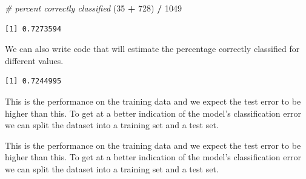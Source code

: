 \documentclass[]{article}
\newenvironment{Shaded}{\begin{snugshade}}{\end{snugshade}}
\newcommand{\CommentTok}[1]{\textcolor[rgb]{0.56,0.35,0.01}{\textit{#1}}}
\newcommand{\DataTypeTok}[1]{\textcolor[rgb]{0.13,0.29,0.53}{#1}}
\newcommand{\DecValTok}[1]{\textcolor[rgb]{0.00,0.00,0.81}{#1}}
\newcommand{\KeywordTok}[1]{\textcolor[rgb]{0.13,0.29,0.53}{\textbf{#1}}}
\newcommand{\NormalTok}[1]{#1}
\newcommand{\OperatorTok}[1]{\textcolor[rgb]{0.81,0.36,0.00}{\textbf{#1}}}
\newcommand{\OtherTok}[1]{\textcolor[rgb]{0.56,0.35,0.01}{#1}}
\newcommand{\StringTok}[1]{\textcolor[rgb]{0.31,0.60,0.02}{#1}}
\begin{document}
\begin{Shaded}
\begin{Highlighting}[]
\CommentTok{# percent correctly classified}
\NormalTok{(}\DecValTok{35} \OperatorTok{+}\StringTok{ }\DecValTok{728}\NormalTok{) }\OperatorTok{/}\StringTok{ }\DecValTok{1049}
\end{Highlighting}
\end{Shaded}

\begin{verbatim}
[1] 0.7273594
\end{verbatim}

We can also write code that will estimate the percentage correctly classified for different values.

\begin{Shaded}
\end{Shaded}

\begin{verbatim}
[1] 0.7244995
\end{verbatim}

This is the performance on the training data and we expect the test error to be higher than this. To get at a better indication of the model's classification error we can split the dataset into a training set and a test set.

This is the performance on the training data and we expect the test error to be higher than this. To get at a better indication of the model's classification error we can split the dataset into a training set and a test set.

\begin{Shaded}
\end{Shaded}
\end{document}

